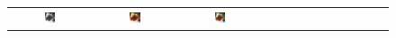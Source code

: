 \documentclass[10pt,twocolumn,letterpaper]{article}
\def\acollumsize{0.14\textwidth}
\begin{document}
\begin{figure}[t!]
\begin{center}
\begin{tabular}{ ccccccccccccc }
\includegraphics[width=\acollumsize]{img/result/13_in.JPEG}&
\includegraphics[width=\acollumsize]{img/result/13.png}&
\includegraphics[width=\acollumsize]{img/result/13_gt.JPEG}& \\


\end{tabular}
\end{center}
\end{figure}
\end{document}
